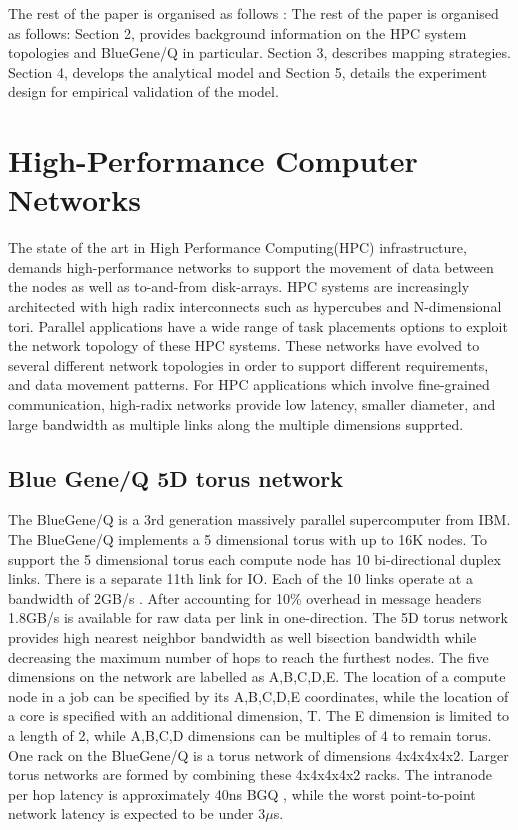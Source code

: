 \documentclass{acm_proc_article-sp}
\begin{document}
The rest of the paper is organised as follows :
The rest of the paper is organised as follows: Section 2, provides background information on
the HPC system topologies and BlueGene/Q in particular. Section 3, describes mapping strategies.
Section 4, develops the analytical model and Section 5, details the experiment design for empirical
validation of the model.


\section{High-Performance Computer Networks}

The state of the art in High Performance Computing(HPC) infrastructure, demands high-performance networks
to support the movement of data between the nodes as well as to-and-from disk-arrays. HPC systems are
increasingly architected with high radix interconnects such as hypercubes and N-dimensional tori.
Parallel applications have a wide range of task placements options to exploit the network topology of
these HPC systems. These networks have evolved to several different network topologies in order to support
different requirements, and data movement patterns. For HPC applications which involve fine-grained communication,
high-radix networks provide low latency, smaller diameter, and large bandwidth as multiple links along the multiple
dimensions supprted.

\subsection{Blue Gene/Q 5D torus network}

The BlueGene/Q is a 3rd generation massively parallel supercomputer from IBM. The BlueGene/Q implements a 5 dimensional torus with up to 16K nodes.
To support the 5 dimensional torus each compute node has 10 bi-directional duplex links. There is a separate 11th link for IO. Each of the 10 links
operate at a bandwidth of 2GB/s \cite{BGQ_RedBook_2013}. After accounting for 10\% overhead in message headers 1.8GB/s is available for raw data per link in one-direction.
The 5D torus network provides high nearest neighbor bandwidth as well bisection bandwidth while decreasing the maximum number of hops to reach
the furthest nodes. The five dimensions on the network are labelled as
A,B,C,D,E.  The location of a compute node in a job can be specified
by its A,B,C,D,E coordinates, while the location of a core is specified
with an additional dimension, T. The E dimension is limited to a length
of 2, while A,B,C,D dimensions can be multiples of 4 to remain torus.
One rack on the BlueGene/Q is a torus network of dimensions 4x4x4x4x2.
Larger torus networks are formed by combining these 4x4x4x4x2 racks.
The intranode per hop latency is approximately 40ns BGQ \cite{BGQ_Interconnect_2012}, 
while the worst point-to-point network latency is expected to be under 3$\mu$s. 
\end{document}
